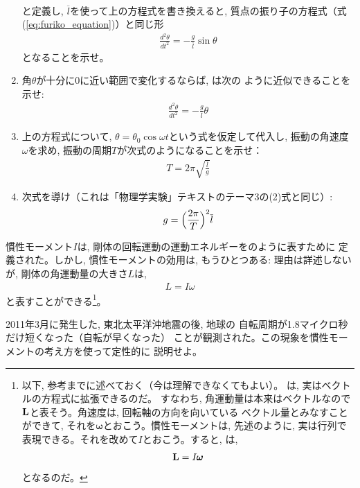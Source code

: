 \begin{q}
\begin{q}
\begin{enumerate}
\begin{eqnarray}
\end{eqnarray}
と定義し, $\overline{l}$を使って上の方程式を書き換えると, 質点の振り子の方程式（式(\ref{eq:furiko_equation})）と同じ形
\begin{eqnarray}
\frac{d^2\theta}{dt^2}=-\frac{g}{\overline{l}}\sin\theta\label{q:mominert_pandulum7}
\end{eqnarray}
となることを示せ。
\item 角$\theta$が十分に0に近い範囲で変化するならば, は次の
ように近似できることを示せ:
\begin{eqnarray}
\frac{d^2\theta}{dt^2}=-\frac{g}{\overline{l}}\theta\label{q:mominert_pandulum8}
\end{eqnarray}
\item 上の方程式について, $\theta=\theta_0 \cos \omega t$という式を仮定して代入し, 
振動の角速度$\omega$を求め, 振動の周期$T$が次式のようになることを示せ：
\begin{eqnarray}
T=2\pi\sqrt{\frac{\overline{l}}{g}}\label{q:mominert_pandulum9}
\end{eqnarray}
\item 次式を導け（これは「物理学実験」テキストのテーマ3の(2)式と同じ）:
\begin{eqnarray}g=\Bigl(\frac{2\pi}{T}\Bigr)^2\overline{l}\end{eqnarray}

\end{enumerate}
\end{q}
\mv

慣性モーメント$I$は, 剛体の回転運動の運動エネルギーをのように表すために
定義された。しかし, 慣性モーメントの効用は, もうひとつある: 理由は詳述しないが, 
剛体の角運動量の大きさ$L$は, 
\begin{eqnarray}
L=I\omega\label{eq:mominert_angmom}
\end{eqnarray}
と表すことができる\footnote{以下, 参考までに述べておく（今は理解できなくてもよい）。
は, 実はベクトルの方程式に拡張できるのだ。
すなわち, 角運動量は本来はベクトルなので${\bf L}$と表そう。角速度は, 回転軸の方向を向いている
ベクトル量とみなすことができて, それを$\pmb{\omega}$とおこう。慣性モーメントは, 先述のように, 
実は行列で表現できる。それを改めて$I$とおこう。すると, は, 
\begin{eqnarray}
{\bf L}=I\pmb{\omega}\label{eq:mominert_angmom_vect}
\end{eqnarray}
\mv
となるのだ。}。\mv

%
\begin{q}\label{q:mominert_earthquake}
2011年3月に発生した, 東北太平洋沖地震の後, 地球の
自転周期が1.8マイクロ秒だけ短くなった（自転が早くなった）
ことが観測された。この現象を慣性モーメントの考え方を使って定性的に
説明せよ。
\end{q}


\end{q}
